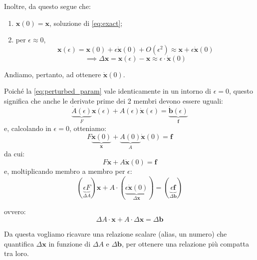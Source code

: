 Inoltre, da questo segue che:
\begin{enumerate}
    \item $\mathbf{x}(0) = \mathbf{x}$, soluzione di \eqref{eq:exact};
    \item per $\epsilon \approx 0$,
    $$ \mathbf{x}(\epsilon) = \mathbf{x}(0) + \epsilon \dot{\mathbf{x}}(0) + O(\epsilon^2) \approx \mathbf{x} + \epsilon \dot{\mathbf{x}}(0) $$
    $$ \implies \Delta \mathbf{x} = \mathbf{x}(\epsilon) - \mathbf{x} \approx \epsilon \cdot \dot{\mathbf{x}}(0) $$
\end{enumerate}
Andiamo, pertanto, ad ottenere $\dot{\mathbf{x}}(0)$.

Poiché la \eqref{eq:perturbed_param} vale identicamente in un intorno di $\epsilon = 0$, questo significa che anche le derivate prime dei 2 membri devono essere uguali:
$$ \underbrace{\dot{A}(\epsilon)}_{F} \mathbf{x}(\epsilon) + A(\epsilon) \dot{\mathbf{x}}(\epsilon) = \underbrace{\dot{\mathbf{b}}(\epsilon)}_{\mathbf{f}} $$
e, calcolando in $\epsilon = 0$, otteniamo:
$$ F \underbrace{\mathbf{x}(0)}_{\mathbf{x}} + \underbrace{A(0)}_{A} \dot{\mathbf{x}}(0) = \mathbf{f} $$
da cui:
$$ F \mathbf{x} + A \dot{\mathbf{x}}(0) = \mathbf{f} $$
e, moltiplicando membro a membro per $\epsilon$:
$$ (\underbrace{\epsilon F}_{\Delta A}) \mathbf{x} + A \cdot (\underbrace{\epsilon \dot{\mathbf{x}}(0)}_{\Delta \mathbf{x}}) = (\underbrace{\epsilon \mathbf{f}}_{\Delta \mathbf{b}}) $$

ovvero:
\begin{equation} \label{eq:fund_relation}
    \Delta A \cdot \mathbf{x} + A \cdot \Delta \mathbf{x} = \Delta \mathbf{b}
\end{equation}



Da questa vogliamo ricavare una relazione scalare (alias, un numero) che quantifica $\Delta\mathbf{x}$ in funzione di $\Delta A$ e $\Delta\mathbf{b}$, per ottenere una relazione più compatta tra loro.

